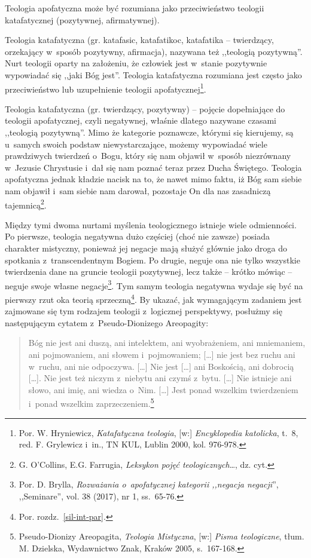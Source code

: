 Teologia apofatyczna może być rozumiana jako przeciwieństwo teologii katafatycznej (pozytywnej, afirmatywnej).


\begin{defin}
Teologia katafatyczna (gr. \textgreek{katafasic}, \textgreek{katafatikoc}, \textgreek{katafatika} -- twierdzący, orzekający w~sposób pozytywny, afirmacja), nazywana też ,,teologią pozytywną''. Nurt teologii oparty na założeniu, że człowiek jest w~stanie pozytywnie wypowiadać się ,,jaki Bóg jest''. Teologia katafatyczna rozumiana jest często jako przeciwieństwo lub uzupełnienie teologii apofatycznej\footnote{Por. W. Hryniewicz, \textit{Katafatyczna teologia}, [w:] \textit{Encyklopedia katolicka}, t.~8, red. F. Grylewicz i~in., TN KUL, Lublin 2000, kol. 976-978.}.
\end{defin}
\begin{defin}
Teologia katafatyczna (gr. twierdzący, pozytywny) -- pojęcie dopełniające do teologii apofatycznej, czyli negatywnej, właśnie dlatego nazywane czasami ,,teologią pozytywną''. Mimo że kategorie poznawcze, którymi się kierujemy, są u~samych swoich podstaw niewystarczające, możemy wypowiadać wiele prawdziwych twierdzeń o~Bogu, który się nam objawił w~sposób niezrównany w~Jezusie Chrystusie i~dał się nam poznać teraz przez Ducha Świętego. Teologia apofatyczna jednak kładzie nacisk na to, że nawet mimo faktu, iż Bóg sam siebie nam objawił i~sam siebie nam darował, pozostaje On dla nas zasadniczą tajemnicą\footnote{G. O'Collins, E.G. Farrugia, \textit{Leksykon pojęć teologicznych}\ldots, dz. cyt.}.
\end{defin}

Między tymi dwoma nurtami myślenia teologicznego istnieje wiele odmienności. Po pierwsze, teologia negatywna dużo częściej (choć nie zawsze) posiada charakter mistyczny, ponieważ jej negacje mają służyć głównie jako droga do spotkania z~transcendentnym Bogiem. Po drugie, neguje ona nie tylko wszystkie twierdzenia dane na gruncie teologii pozytywnej, lecz także -- krótko mówiąc -- neguje swoje własne negacje\footnote{Por. D. Brylla, \textit{Rozważania o~apofatycznej kategorii ,,negacja negacji}'', ,,Seminare'', vol. 38 (2017), nr 1, ss.~65-76.}. Tym samym teologia negatywna wydaje się być na pierwszy rzut oka teorią sprzeczną\footnote{Por. rozdz.~\ref{sil-int-par}.}. By ukazać, jak wymagającym zadaniem jest zajmowane się tym rodzajem teologii z~logicznej perspektywy, posłużmy się następującym cytatem z~Pseudo-Dionizego Areopagity:

\begin{quote}
Bóg nie jest ani duszą, ani intelektem, ani wyobrażeniem, ani mniemaniem, ani pojmowaniem, ani słowem i~pojmowaniem; [\ldots] nie jest bez ruchu ani w~ruchu, ani nie odpoczywa. [\ldots] Nie jest [\ldots] ani Boskością, ani dobrocią [\ldots]. Nie jest też niczym z~niebytu ani czymś z~bytu. [\ldots] Nie istnieje ani słowo, ani imię, ani wiedza o~Nim. [\ldots] Jest ponad wszelkim twierdzeniem i~ponad wszelkim zaprzeczeniem.\footnote{Pseudo-Dionizy Areopagita, \textit{Teologia Mistyczna}, [w:] \textit{Pisma teologiczne}, tłum. M. Dzielska, Wydawnictwo Znak, Kraków 2005, s.~167-168.}
\end{quote}

